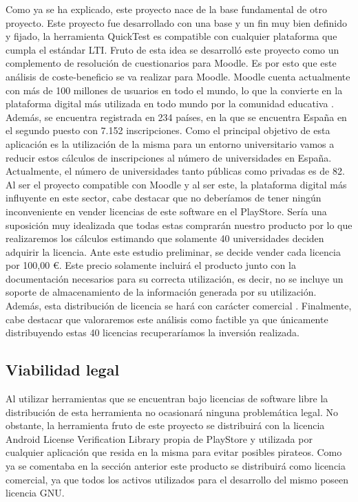 Como ya se ha explicado, este proyecto nace de la base fundamental de otro proyecto. Este proyecto fue desarrollado con una base y un fin muy bien definido y fijado, la herramienta QuickTest es compatible con cualquier plataforma que cumpla el estándar LTI. Fruto de esta idea se desarrolló este proyecto como un complemento de resolución de cuestionarios para Moodle. Es por esto que este análisis de coste-beneficio se va realizar para Moodle.
Moodle cuenta actualmente con más de 100 millones de usuarios en todo el mundo, lo que la convierte en la plataforma digital más utilizada en todo mundo por la comunidad educativa \cite{wiki:mest} \cite{wiki:moodlestas}. Además, se encuentra registrada en 234 países, en la que se encuentra España en el segundo puesto con 7.152 inscripciones.
Como el principal objetivo de esta aplicación es la utilización de la misma para un entorno universitario vamos a reducir estos cálculos de inscripciones al número de universidades en España. Actualmente, el número de universidades tanto públicas como privadas es de 82. 
Al ser el proyecto compatible con Moodle y al ser este, la plataforma digital más influyente en este sector, cabe destacar que no deberíamos de tener ningún inconveniente en vender licencias de este software en el PlayStore. Sería una suposición muy idealizada que todas estas comprarán nuestro producto por lo que realizaremos los cálculos estimando que solamente 40 universidades deciden adquirir la licencia.
Ante este estudio preliminar, se decide vender cada licencia por 100,00 \euro. Este precio solamente incluirá el producto junto con la documentación necesarios para su correcta utilización, es decir, no se incluye un soporte de almacenamiento de la información generada por su utilización. Además, esta distribución de licencia se hará con carácter comercial \cite{wiki:liccom}. 
Finalmente, cabe destacar que valoraremos este análisis como factible ya que únicamente distribuyendo estas 40 licencias recuperaríamos la inversión realizada.



\subsection{Viabilidad legal}

Al utilizar herramientas que se encuentran bajo licencias de software libre la distribución de esta herramienta no ocasionará ninguna problemática legal.
No obstante, la herramienta fruto de este proyecto se distribuirá con la licencia Android License Verification Library \cite{wiki:androidlic} propia de PlayStore y utilizada por cualquier aplicación que resida en la misma para evitar posibles pirateos.
Como ya se comentaba en la sección anterior este producto se distribuirá como licencia comercial, ya que todos los activos utilizados para el desarrollo del mismo poseen licencia GNU.



